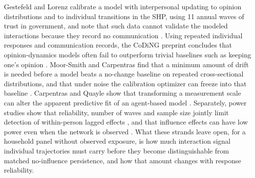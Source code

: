 
Gestefeld and Lorenz calibrate a model with interpersonal updating to opinion distributions and to individual transitions in the SHP, using 11 annual waves of trust in government, and note that such data cannot validate the modeled interactions because they record no communication \cite{gestefeld2023}.
Using repeated individual responses and communication records, the CoDiNG preprint concludes that opinion-dynamics models often fail to outperform trivial baselines such as keeping one's opinion \cite{coding2024}.
Moor-Smith and Carpentras find that a minimum amount of drift is needed before a model beats a no-change baseline on repeated cross-sectional distributions, and that under noise the calibration optimizer can freeze into that baseline \cite{moor2026}.
Carpentras and Quayle show that transforming a measurement scale can alter the apparent predictive fit of an agent-based model \cite{carpentras2023}.
Separately, power studies show that reliability, number of waves and sample size jointly limit detection of within-person lagged effects \cite{mulder2023,dang2026}, and that influence effects can have low power even when the network is observed \cite{stadtfeld2020}.
What these strands leave open, for a household panel without observed exposure, is how much interaction signal individual trajectories must carry before they become distinguishable from matched no-influence persistence, and how that amount changes with response reliability.

